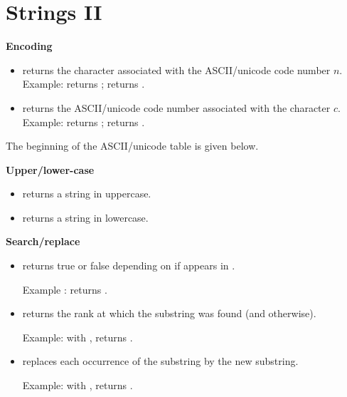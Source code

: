 \documentclass[11pt,class=report,crop=false]{standalone}
\begin{document}
\section{Strings II}



\textbf{Encoding}

\begin{itemize}
  \item {} \quad returns the character associated with the ASCII/unicode code number $n$. Example:  returns ;  returns .
    
  \item {} \quad returns the ASCII/unicode code number associated with the character $c$. Example:  returns ;  returns .
\end{itemize}

The beginning of the ASCII/unicode table is given below.


\bigskip

\textbf{Upper/lower-case}

\begin{itemize}
  \item {} returns a string in uppercase.
  \item {} returns a string in lowercase.  
\end{itemize}

\bigskip

\textbf{Search/replace}

\begin{itemize}
  \item {} \quad returns \og{}true\fg{} or \og{}false\fg{} depending on if  appears in .
  
   Example :
 returns .

  \item {} \quad returns the rank at which the substring was found (and  otherwise).
  
  Example: with ,  returns .
  
   \item {} \quad replaces 
   each occurrence of the substring by the new substring.
   
   Example: with ,  returns
   .

\end{itemize}
\end{document}

